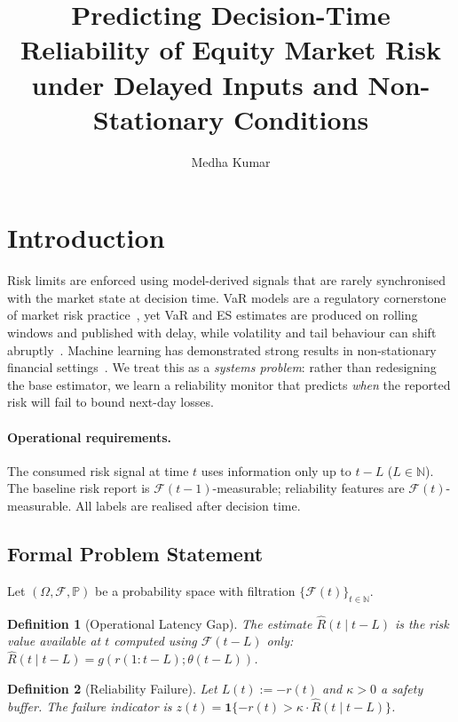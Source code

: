 \documentclass[sigconf, anonymous]{acmart}
\title{Predicting Decision-Time Reliability of Equity Market Risk under Delayed Inputs and Non-Stationary Conditions}
\author{Medha Kumar}
\affiliation{%
  \institution{National Institute of Technology Surat}
  \city{Surat}
  \state{Gujarat}
  \country{India}
}
\newtheorem{definition}{Definition}
\begin{document}
\maketitle

\section{Introduction}

Risk limits are enforced using model-derived signals that are rarely
synchronised with the market state at decision time. VaR models are a 
regulatory cornerstone of market risk practice~\cite{basel2019}, yet VaR 
and ES estimates are produced on rolling windows and published with delay, 
while volatility and tail behaviour can shift abruptly~\cite{cont2001empirical}.
Machine learning has demonstrated strong results in non-stationary financial 
settings~\cite{dixon2020machine}. We treat this as a \emph{systems problem}: 
rather than redesigning the base estimator, we learn a reliability monitor 
that predicts \emph{when} the reported risk will fail to bound next-day losses.

\paragraph{Operational requirements.}
The consumed risk signal at time $t$ uses information only up to $t-L$
($L\in\mathbb{N}$). The baseline risk report is
$\mathcal{F}(t-1)$-measurable; reliability features are
$\mathcal{F}(t)$-measurable. All labels are realised after decision
time.

\subsection{Formal Problem Statement}

Let $(\Omega,\mathcal{F},\mathbb{P})$ be a probability space with
filtration $\{\mathcal{F}(t)\}_{t\in\mathbb{N}}$.

\begin{definition}[Operational Latency Gap]
The estimate $\hat{R}(t\mid t{-}L)$ is the risk value available at $t$
computed using $\mathcal{F}(t{-}L)$ only:
$\hat{R}(t\mid t{-}L)=g(r(1\!:\!t{-}L);\theta(t{-}L))$.
\end{definition}

\begin{definition}[Reliability Failure]
Let $L(t){:=}{-}r(t)$ and $\kappa{>}0$ a safety buffer. The failure
indicator is $z(t)=\mathbf{1}\{-r(t)>\kappa\cdot\hat{R}(t\mid t{-}L)\}$.
\end{definition}
\end{document}
